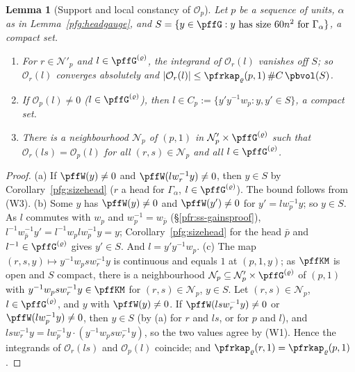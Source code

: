 \documentclass[10pt]{amsart}
\newtheorem{lemma}[theorem]{Lemma}
\theoremstyle{definition}
\theoremstyle{remark}
\begin{document}
\begin{lemma}[Support and local constancy of $\mathcal O_p$]\label{pfg:Op}
Let $p$ be a sequence of units, $\alpha$ as in Lemma~\ref{pfg:headgauge}, and $S=\{y\in\pffG:y\text{ has size }60n^2\text{ for }
\Gamma_\alpha\}$, a compact set.
\begin{enumerate}
\item[(a)] For $r\in\mathcal N'_p$ and $l\in\pffG^{(\varrho)}$, the integrand of $\mathcal O_r(l)$ vanishes off $S$; so
$\mathcal O_r(l)$ converges absolutely and $|\mathcal O_r(l)|\le\pfrkap_\varrho(p,1)\,\#C\,\pbvol(S)$.
\item[(b)] If $\mathcal O_p(l)\ne0$ ($l\in\pffG^{(\varrho)}$), then $l\in C_p:=\{y'y^{-1}w_p:y,y'\in S\}$, a compact set.
\item[(c)] There is a neighbourhood $\mathcal N_p$ of $(p,1)$ in $\mathcal N'_p\times\pffG^{(\varrho)}$ such that
$\mathcal O_r(ls)=\mathcal O_p(l)$ for all $(r,s)\in\mathcal N_p$ and all $l\in\pffG^{(\varrho)}$.
\end{enumerate}
\end{lemma}
\begin{proof}
(a) If $\pffW(y)\ne0$ and $\pffW(lw_r^{-1}y)\ne0$, then $y\in S$ by Corollary~\ref{pfg:sizehead} ($r$ a head for $\Gamma_\alpha$,
$l\in\pffG^{(\varrho)}$). The bound follows from (W3). (b) Some $y$ has $\pffW(y)\ne0$ and $\pffW(y')\ne0$ for $y'=lw_p^{-1}y$; so
$y\in S$. As $l$ commutes with $w_p$ and $w_p^{-1}=w_{\bar p}$ (\S\ref{pfr:ss-gainsproof}), $l^{-1}w_{\bar p}^{-1}y'=
l^{-1}w_plw_p^{-1}y=y$; Corollary~\ref{pfg:sizehead} for the head $\bar p$ and $l^{-1}\in\pffG^{(\varrho)}$ gives $y'\in S$. And
$l=y'y^{-1}w_p$. (c) The map $(r,s,y)\mapsto y^{-1}w_psw_r^{-1}y$ is continuous and equals $1$ at $(p,1,y)$; as $\pffKM$ is open
and $S$ compact, there is a neighbourhood $\mathcal N_p\subseteq\mathcal N'_p\times\pffG^{(\varrho)}$ of $(p,1)$ with
$y^{-1}w_psw_r^{-1}y\in\pffKM$ for $(r,s)\in\mathcal N_p$, $y\in S$. Let $(r,s)\in\mathcal N_p$, $l\in\pffG^{(\varrho)}$, and
$y$ with $\pffW(y)\ne0$. If $\pffW(lsw_r^{-1}y)\ne0$ or $\pffW(lw_p^{-1}y)\ne0$, then $y\in S$ (by (a) for $r$ and $ls$, or for $p$
and $l$), and $lsw_r^{-1}y=lw_p^{-1}y\cdot(y^{-1}w_psw_r^{-1}y)$, so the two values agree by (W1). Hence the integrands of
$\mathcal O_r(ls)$ and $\mathcal O_p(l)$ coincide; and $\pfrkap_\varrho(r,1)=\pfrkap_\varrho(p,1)$.
\end{proof}
\end{document}
